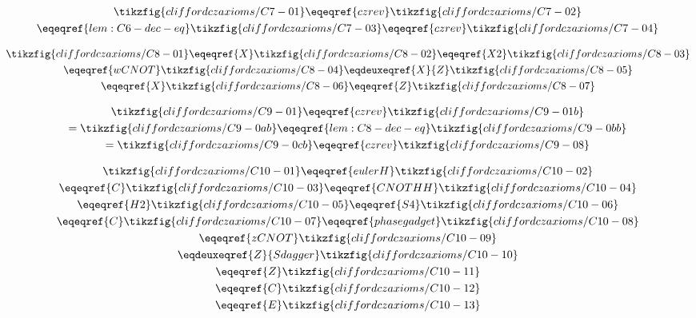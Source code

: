 \begin{derivation}\label{lem:C7-dec-eq}
\begin{gather*}
  \tikzfig{cliffordczaxioms/C7-01}
  \eqeqref{czrev}\tikzfig{cliffordczaxioms/C7-02}\\
  \eqeqref{lem:C6-dec-eq}\tikzfig{cliffordczaxioms/C7-03}
  \eqeqref{czrev}\tikzfig{cliffordczaxioms/C7-04}
\end{gather*}
\end{derivation}

\begin{derivation}\label{lem:C8-dec-eq}
\begin{gather*}
  \tikzfig{cliffordczaxioms/C8-01}
  \eqeqref{X}\tikzfig{cliffordczaxioms/C8-02}
  \eqeqref{X2}\tikzfig{cliffordczaxioms/C8-03}\\
  \eqeqref{wCNOT}\tikzfig{cliffordczaxioms/C8-04}
  \eqdeuxeqref{X}{Z}\tikzfig{cliffordczaxioms/C8-05}\\
  \eqeqref{X}\tikzfig{cliffordczaxioms/C8-06}
  \eqeqref{Z}\tikzfig{cliffordczaxioms/C8-07}
\end{gather*}
\end{derivation}

\begin{derivation}\label{lem:C9-dec-eq}
\begin{gather*}
  \tikzfig{cliffordczaxioms/C9-01}
  \eqeqref{czrev} \tikzfig{cliffordczaxioms/C9-01b}\\
  = \tikzfig{cliffordczaxioms/C9-0ab}
  \eqeqref{lem:C8-dec-eq}\tikzfig{cliffordczaxioms/C9-0bb}\\
  = \tikzfig{cliffordczaxioms/C9-0cb}
  \eqeqref{czrev} \tikzfig{cliffordczaxioms/C9-08}
\end{gather*}
\end{derivation}

\begin{derivation}\label{lem:C10-dec-eq}
\begin{gather*}
  \tikzfig{cliffordczaxioms/C10-01}
  \eqeqref{eulerH}\tikzfig{cliffordczaxioms/C10-02}\\
  \eqeqref{C}\tikzfig{cliffordczaxioms/C10-03}
  \eqeqref{CNOTHH}\tikzfig{cliffordczaxioms/C10-04}\\
  \eqeqref{H2}\tikzfig{cliffordczaxioms/C10-05}
  \eqeqref{S4}\tikzfig{cliffordczaxioms/C10-06}\\
  \eqeqref{C}\tikzfig{cliffordczaxioms/C10-07}
  \eqeqref{phasegadget}\tikzfig{cliffordczaxioms/C10-08}\\
  \eqeqref{zCNOT}\tikzfig{cliffordczaxioms/C10-09}\\
  \eqdeuxeqref{Z}{Sdagger}\tikzfig{cliffordczaxioms/C10-10}\\
  \eqeqref{Z}\tikzfig{cliffordczaxioms/C10-11}\\
  \eqeqref{C}\tikzfig{cliffordczaxioms/C10-12}\\
  \eqeqref{E}\tikzfig{cliffordczaxioms/C10-13}
\end{gather*}
\end{derivation}

